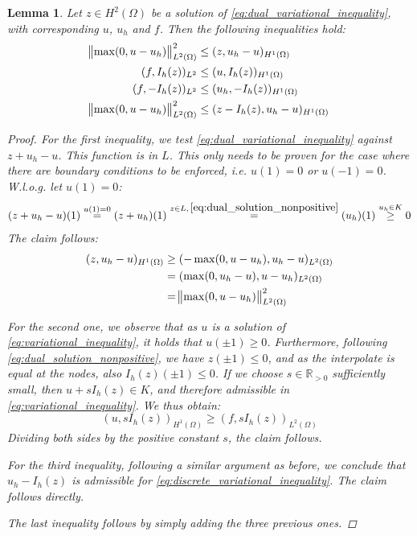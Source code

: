 \documentclass[headsepline,footsepline,footinclude=false,oneside,fontsize=11pt,paper=a4,listof=totoc,bibliography=totoc]{scrbook} %
\newtheorem{lemma}{Lemma}
\begin{document}
\begin{lemma}
	Let $z \in H^2(\Omega)$ be a solution of \eqref{eq:dual_variational_inequality}, with corresponding $u$, $u_h$ and $f$. Then the following inequalities hold:
	\begin{align}
		\norm{\max(0,u-u_h)}_{L^2(\Omega)}^2 &\leq (z,u_h-u)_{H^1(\Omega)} \\
		(f, I_h(z))_{L^2} &\leq (u, I_h(z))_{H^1(\Omega)} \\
		(f, -I_h(z))_{L^2} &\leq (u_h, -I_h(z))_{H^1(\Omega)} \\
		\norm{\max(0,u-u_h)}_{L^2(\Omega)}^2 &\leq (z-I_h(z), u_h - u)_{H^1(\Omega)} \label{eq:scalar_product_ineq_L2}
	\end{align}
	\begin{proof}
		For the first inequality, we test \eqref{eq:dual_variational_inequality} against $z+u_h-u$. This function is in $L$. This only needs to be proven for the case where there are boundary conditions to be enforced, i.e. $u(1) = 0$ or $u(-1) = 0$. W.l.o.g. let $u(1) = 0$: 
		\begin{equation*}
		(z + u_h - u)(1) \overset{u(1) = 0}{=} (z + u_h)(1) \overset{z \in L,\, \eqref{eq:dual_solution_nonpositive}}{=} (u_h)(1) \overset{u_h \in K}{\geq} 0
		\end{equation*}
		The claim follows:
		\begin{align*}
		(z, u_h-u)_{H^1(\Omega)} &\geq (-\max(0,u-u_h), u_h-u)_{L^2(\Omega)} \\
		&= (\max(0,u_h-u), u-u_h)_{L^2(\Omega)} \\
		&= \norm{\max(0,u-u_h)}_{L^2(\Omega)}^2
		\end{align*}
		
		For the second one, we observe that as $u$ is a solution of \eqref{eq:variational_inequality}, it holds that $u(\pm 1) \geq 0$. Furthermore, following \eqref{eq:dual_solution_nonpositive}, we have $z(\pm 1) \leq 0$, and as the interpolate is equal at the nodes, also $I_h(z)(\pm 1) \leq 0$. If we choose $s \in \mathbb{R}_{>0}$ sufficiently small, then $u + s I_h(z) \in K$, and therefore admissible in \eqref{eq:variational_inequality}. We thus obtain:
		\begin{equation*}
		(u, sI_h(z))_{H^1(\Omega)} \geq (f,sI_h(z))_{L^2(\Omega)}
		\end{equation*}
		Dividing both sides by the positive constant $s$, the claim follows.
		
		For the third inequality, following a similar argument as before, we conclude that $u_h -I_h(z)$ is admissible for \eqref{eq:discrete_variational_inequality}. The claim follows directly.
		
		The last inequality follows by simply adding the three previous ones.
	\end{proof}
\end{lemma}
\end{document}
